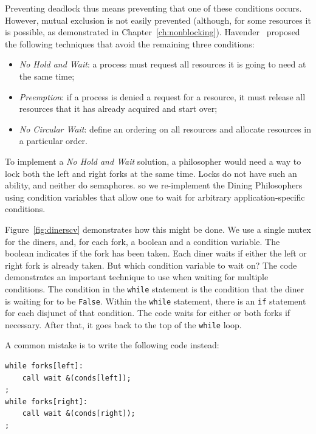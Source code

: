 \documentclass{report}
\newenvironment{code}{
\tcolorbox
}{
\endtcolorbox
}
\begin{document}
Preventing deadlock thus means preventing that one of these conditions occurs.
However, mutual exclusion is not easily prevented (although, for some resources it is
possible, as demonstrated in Chapter~\ref{ch:nonblocking}).
Havender~\cite{Havender68} proposed the following techniques that avoid the remaining
three conditions:

\begin{itemize}
\item \emph{No Hold and Wait}: a process must request all resources it is going to
need at the same time;
\item \emph{Preemption}: if a process is denied a request for a resource, it must
release all resources that it has already acquired and start over;
\item \emph{No Circular Wait}: define an ordering on all resources and allocate
resources in a particular order.
\end{itemize}

To implement a \emph{No Hold and Wait} solution, a philosopher would need a
way to lock both the left and right forks at the same time.  Locks do not
have such an ability, and neither do semaphores. so we re-implement the
Dining Philosophers using condition variables that allow one to wait for
arbitrary application-specific conditions.

Figure~\ref{fig:dinerscv} demonstrates how this might be done.
We use a single mutex for the diners, and, for each fork, a boolean
and a condition variable.  The boolean indicates if the fork has been
taken.
Each diner waits if either the left or right fork is already taken.
But which condition variable to wait on?
The code demonstrates an important technique to use when waiting for
multiple conditions.
The condition in the \texttt{while} statement is the condition that the
diner is waiting for to be \texttt{False}.  Within the \texttt{while} statement,
there is an \texttt{if} statement for each disjunct of that condition.
The code waits for either or both forks if necessary.  After that, it goes
back to the top of the \texttt{while} loop.

A common mistake is to write the following code instead:

\begin{code}
\begin{Verbatim}
while forks[left]:
    call wait &(conds[left]);
;
while forks[right]:
    call wait &(conds[right]);
;
\end{Verbatim}
\end{code}
\end{document}

